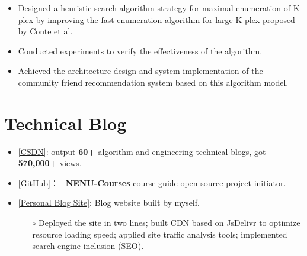 \documentclass{resume}
\begin{document}
\begin{itemize}
    \item Designed a heuristic search algorithm strategy for maximal enumeration of K-plex by improving the fast enumeration 
    algorithm for large K-plex proposed by Conte et al. 
    \item Conducted experiments to verify the effectiveness of the algorithm.
    \item Achieved the architecture design and system implementation of the community friend recommendation system based on this 
    algorithm model.
\end{itemize}

\section{Technical Blog}
\begin{itemize}
    \item \href{https://blog.csdn.net/liangllhahaha?type=blog}{[CSDN]}: output \textbf{60+} algorithm and engineering technical 
    blogs, got \textbf{570,000+} views.

    \item \href{https://github.com/leungll}{[GitHub]}：
    \href{https://github.com/leungll/NENU-Courses}{\faGithub \ \textbf{NENU-Courses}} course guide open source project initiator.

    \item \href{https://leungll.site/archives}{[Personal Blog Site]}: Blog website built by myself.
    \begin{itemize}
      \item[$\circ$] Deployed the site in two lines; built CDN based on JsDelivr to optimize resource loading speed; 
      applied site traffic analysis tools; implemented search engine inclusion (SEO).
    \end{itemize}

\end{itemize}
\end{document}
